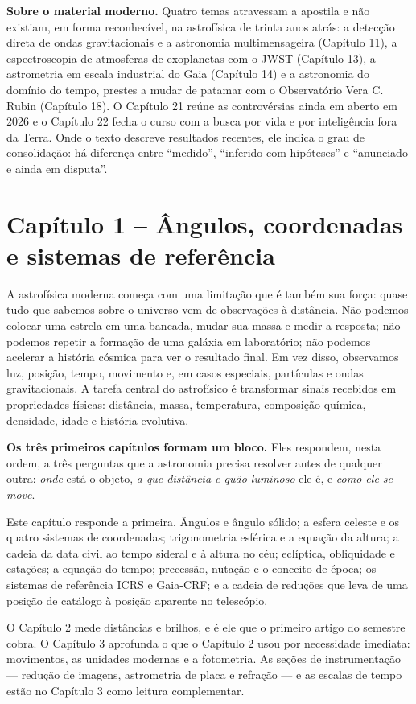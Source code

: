 \documentclass[11pt,a4paper]{article}
\begin{document}
\begin{noticebox}
\textbf{Sobre o material moderno.} Quatro temas atravessam a apostila e não existiam, em forma reconhecível, na astrofísica de trinta anos atrás: a detecção direta de ondas gravitacionais e a astronomia multimensageira (Capítulo 11), a espectroscopia de atmosferas de exoplanetas com o JWST (Capítulo 13), a astrometria em escala industrial do Gaia (Capítulo 14) e a astronomia do domínio do tempo, prestes a mudar de patamar com o Observatório Vera C. Rubin (Capítulo 18). O Capítulo 21 reúne as controvérsias ainda em aberto em 2026 e o Capítulo 22 fecha o curso com a busca por vida e por inteligência fora da Terra. Onde o texto descreve resultados recentes, ele indica o grau de consolidação: há diferença entre ``medido'', ``inferido com hipóteses'' e ``anunciado e ainda em disputa''.
\end{noticebox}


\newpage
\section*{Capítulo 1 -- Ângulos, coordenadas e sistemas de referência}
A astrofísica moderna começa com uma limitação que é também sua força: quase tudo que sabemos sobre o universo vem de observações à distância. Não podemos colocar uma estrela em uma bancada, mudar sua massa e medir a resposta; não podemos repetir a formação de uma galáxia em laboratório; não podemos acelerar a história cósmica para ver o resultado final. Em vez disso, observamos luz, posição, tempo, movimento e, em casos especiais, partículas e ondas gravitacionais. A tarefa central do astrofísico é transformar sinais recebidos em propriedades físicas: distância, massa, temperatura, composição química, densidade, idade e história evolutiva.

\begin{noticebox}
\textbf{Os três primeiros capítulos formam um bloco.} Eles respondem, nesta ordem, a três perguntas que a astronomia precisa resolver antes de qualquer outra: \emph{onde} está o objeto, \emph{a que distância e quão luminoso} ele é, e \emph{como ele se move}.

Este capítulo responde a primeira. Ângulos e ângulo sólido; a esfera celeste e os quatro sistemas de coordenadas; trigonometria esférica e a equação da altura; a cadeia da data civil ao tempo sideral e à altura no céu; eclíptica, obliquidade e estações; a equação do tempo; precessão, nutação e o conceito de época; os sistemas de referência ICRS e Gaia-CRF; e a cadeia de reduções que leva de uma posição de catálogo à posição aparente no telescópio.

O Capítulo 2 mede distâncias e brilhos, e é ele que o primeiro artigo do semestre cobra. O Capítulo 3 aprofunda o que o Capítulo 2 usou por necessidade imediata: movimentos, as unidades modernas e a fotometria. As seções de instrumentação --- redução de imagens, astrometria de placa e refração --- e as escalas de tempo estão no Capítulo 3 como leitura complementar.
\end{noticebox}
\end{document}
